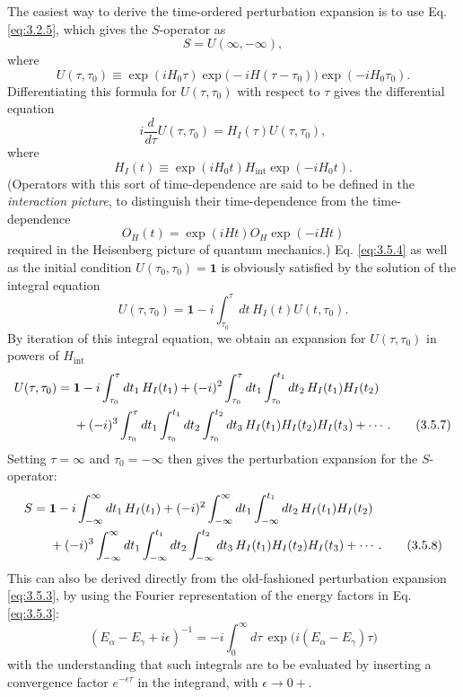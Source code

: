 The easiest way to derive the time-ordered perturbation expansion is to use Eq. \eqref{eq:3.2.5}, which
gives the $S$-operator as
\[
 S=U(\infty,-\infty),
\]
where
\[
 U(\tau,\tau_0)\equiv
 \exp(iH_0\tau)\exp\bigl(-iH(\tau-\tau_0)\bigr)\exp(-iH_0\tau_0).
\]
Differentiating this formula for $U(\tau,\tau_0)$ with respect to $\tau$ gives the differential
equation
\begin{equation}
 i\frac{d}{d\tau}U(\tau,\tau_0)=H_I(\tau)U(\tau,\tau_0),
 \tag{3.5.4}\label{eq:3.5.4}
\end{equation}
where
\begin{equation}
 H_I(t)\equiv\exp(iH_0t)H_{\mathrm{int}}\exp(-iH_0t).
 \tag{3.5.5}\label{eq:3.5.5}
\end{equation}
(Operators with this sort of time-dependence are said to be defined in the \emph{interaction
picture}, to distinguish their time-dependence from the time-dependence
\[
 O_H(t)=\exp(iHt)O_H\exp(-iHt)
\]
required in the Heisenberg picture of quantum mechanics.)
Eq. \eqref{eq:3.5.4} as well as the initial condition $U(\tau_0,\tau_0)=\mathbf{1}$ is obviously satisfied
by the solution of the integral equation
\begin{equation}
 U(\tau,\tau_0)=\mathbf{1}-i\int_{\tau_0}^{\tau}dt\,H_I(t)U(t,\tau_0).
 \tag{3.5.6}\label{eq:3.5.6}
\end{equation}
By iteration of this integral equation, we obtain an expansion for $U(\tau,\tau_0)$ in powers
of $H_{\mathrm{int}}$
\begin{align}
 U(\tau,\tau_0)={}&\mathbf{1}-i\int_{\tau_0}^{\tau}dt_1\,H_I(t_1)
 +(-i)^2\int_{\tau_0}^{\tau}dt_1\int_{\tau_0}^{t_1}dt_2\,H_I(t_1)H_I(t_2)\notag\\
 &+(-i)^3\int_{\tau_0}^{\tau}dt_1\int_{\tau_0}^{t_1}dt_2
 \int_{\tau_0}^{t_2}dt_3\,H_I(t_1)H_I(t_2)H_I(t_3)+\cdots.
 \tag{3.5.7}\label{eq:3.5.7}
\end{align}
Setting $\tau=\infty$ and $\tau_0=-\infty$ then gives the perturbation expansion for the
$S$-operator:
\begin{align}
 S={}&\mathbf{1}-i\int_{-\infty}^{\infty}dt_1\,H_I(t_1)
 +(-i)^2\int_{-\infty}^{\infty}dt_1\int_{-\infty}^{t_1}dt_2\,H_I(t_1)H_I(t_2)\notag\\
 &+(-i)^3\int_{-\infty}^{\infty}dt_1\int_{-\infty}^{t_1}dt_2
 \int_{-\infty}^{t_2}dt_3\,H_I(t_1)H_I(t_2)H_I(t_3)+\cdots.
 \tag{3.5.8}\label{eq:3.5.8}
\end{align}
This can also be derived directly from the old-fashioned perturbation expansion \eqref{eq:3.5.3}, by
using the Fourier representation of the energy factors in Eq. \eqref{eq:3.5.3}:
\begin{equation}
 (E_\alpha-E_\gamma+i\epsilon)^{-1}
 =-i\int_0^\infty d\tau\,\exp\bigl(i(E_\alpha-E_\gamma)\tau\bigr)
 \tag{3.5.9}\label{eq:3.5.9}
\end{equation}
with the understanding that such integrals are to be evaluated by inserting a convergence
factor $e^{-\epsilon\tau}$ in the integrand, with $\epsilon\to0+$.

